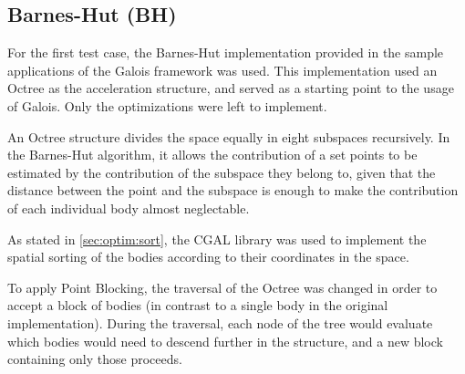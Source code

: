 \subsection{Barnes-Hut (BH)}
\label{sec:cases:barnes}

For the first test case, the Barnes-Hut implementation provided in the sample applications of the Galois framework was used.
This implementation used an Octree as the acceleration structure, and served as a starting point to the usage of Galois. Only the optimizations were left to implement.

An Octree structure divides the space equally in eight subspaces recursively. In the Barnes-Hut algorithm, it allows the contribution of a set points to be estimated by the contribution of the subspace they belong to, given that the distance between the point and the subspace is enough to make the contribution of each individual body almost neglectable.

As stated in \cref{sec:optim:sort}, the CGAL library was used to implement the spatial sorting of the bodies according to their coordinates in the space.

To apply Point Blocking, the traversal of the Octree was changed in order to accept a block of bodies (in contrast to a single body in the original implementation). During the traversal, each node of the tree would evaluate which bodies would need to descend further in the structure, and a new block containing only those proceeds.
